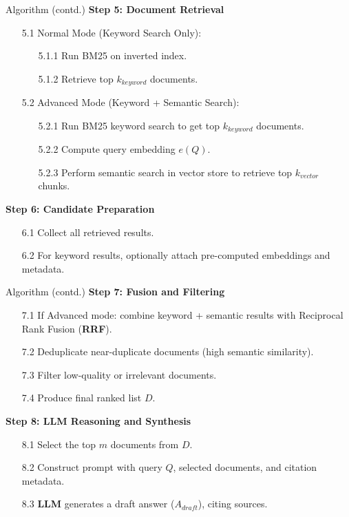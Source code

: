\begin{frame}{Algorithm (contd.)}
\textbf{Step 5: Document Retrieval}
\begin{itemize}
  \item[5.1] Normal Mode (Keyword Search Only):
    \begin{itemize}
      \item[5.1.1] Run BM25 on inverted index.
      \item[5.1.2] Retrieve top $k_{keyword}$ documents.
    \end{itemize}
  \item[5.2] Advanced Mode (Keyword + Semantic Search):
    \begin{itemize}
      \item[5.2.1] Run BM25 keyword search to get top $k_{keyword}$ documents.
      \item[5.2.2] Compute query embedding $e(Q)$.
      \item[5.2.3] Perform semantic search in vector store to retrieve top $k_{vector}$ chunks.
    \end{itemize}
\end{itemize}

\textbf{Step 6: Candidate Preparation}
\begin{itemize}
  \item[6.1] Collect all retrieved results.
  \item[6.2] For keyword results, optionally attach pre-computed embeddings and metadata.
\end{itemize}
\end{frame}

\begin{frame}{Algorithm (contd.)}
\textbf{Step 7: Fusion and Filtering}
\begin{itemize}
  \item[7.1] If Advanced mode: combine keyword + semantic results with Reciprocal Rank Fusion (\textbf{RRF}).
  \item[7.2] Deduplicate near-duplicate documents (high semantic similarity).
  \item[7.3] Filter low-quality or irrelevant documents.
  \item[7.4] Produce final ranked list $D$.
\end{itemize}

\textbf{Step 8: \textbf{LLM} Reasoning and Synthesis}
\begin{itemize}
  \item[8.1] Select the top $m$ documents from $D$.
  \item[8.2] Construct prompt with query $Q$, selected documents, and citation metadata.
  \item[8.3] \textbf{LLM} generates a draft answer ($A_{draft}$), citing sources.
\end{itemize}
\end{frame}


